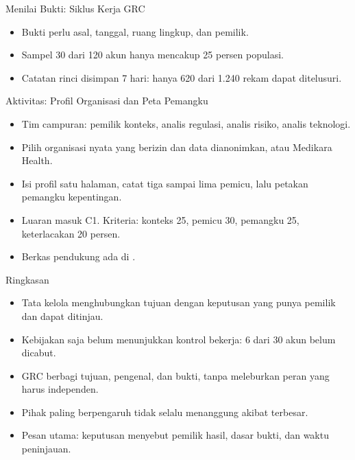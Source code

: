 \documentclass[aspectratio=169, table, 12pt]{beamer}
\begin{document}
\begin{frame}{{\Large Menilai Bukti: Siklus Kerja GRC}}
  \centering
  \resizebox{0.9\textwidth}{!}{}

  \vspace{4pt}
  \raggedright\small
  \begin{itemize}
    \item Bukti perlu asal, tanggal, ruang lingkup, dan pemilik.
    \item Sampel 30 dari 120 akun hanya mencakup 25 persen populasi.
    \item Catatan rinci disimpan 7 hari: hanya 620 dari 1.240 rekam dapat ditelusuri.
  \end{itemize}
\end{frame}

\begin{frame}{{\Large Aktivitas: Profil Organisasi dan Peta Pemangku}}
  \vspace{4pt}
  \small
  \begin{itemize}
    \item Tim campuran: pemilik konteks, analis regulasi, analis risiko, analis teknologi.
    \item Pilih organisasi nyata yang berizin dan data dianonimkan, atau Medikara Health.
    \item Isi profil satu halaman, catat tiga sampai lima pemicu, lalu petakan pemangku kepentingan.
    \item Luaran masuk C1. Kriteria: konteks 25, pemicu 30, pemangku 25, keterlacakan 20 persen.
    \item Berkas pendukung ada di .
  \end{itemize}
\end{frame}

\begin{frame}{{\Large Ringkasan}}
  \vspace{4pt}
  \small
  \begin{itemize}
    \item Tata kelola menghubungkan tujuan dengan keputusan yang punya pemilik dan dapat ditinjau.
    \item Kebijakan saja belum menunjukkan kontrol bekerja: 6 dari 30 akun belum dicabut.
    \item GRC berbagi tujuan, pengenal, dan bukti, tanpa meleburkan peran yang harus independen.
    \item Pihak paling berpengaruh tidak selalu menanggung akibat terbesar.
    \item Pesan utama: keputusan menyebut pemilik hasil, dasar bukti, dan waktu peninjauan.
  \end{itemize}
\end{frame}
\end{document}
